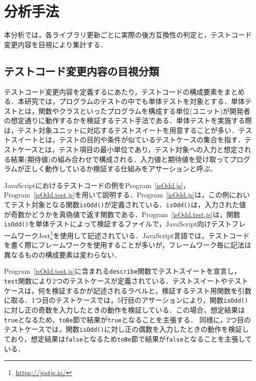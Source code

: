 \documentclass[11pt,dvipdfmx]{jreport}
\begin{document}


\section{分析手法}
本分析では，各ライブラリ更新ごとに実際の後方互換性の判定と，テストコード変更内容を目視により集計する．

\subsection{テストコード変更内容の目視分類}
テストコード変更内容を定義するにあたり，テストコードの構成要素をまとめる．本研究では，プログラムのテストの中でも単体テストを対象とする．単体テストとは，関数やクラスといったプログラムを構成する単位(ユニット)が開発者の想定通りに動作するかを検証するテスト手法である．単体テストを実施する際は，テスト対象ユニットに対応するテストスイートを用意することが多い．テストスイートとは，テストの目的や条件が似ているテストケースの集合を指す．テストケースとは，テスト項目の最小単位であり，テスト対象への入力と想定される結果(期待値)の組み合わせで構成される．入力値と期待値を受け取ってプログラムが正しく動作しているか検証する仕組みをアサーションと呼ぶ．

JavaScriptにおけるテストコードの例をProgram~\ref{isOdd.js}，Program~\ref{isOdd.test.js}を用いて説明する．Program~\ref{isOdd.js}は，この例においてテスト対象となる関数{\verb|isOdd()|}が定義されている．{\verb|isOdd()|}は，入力された値が奇数かどうかを真偽値で返す関数である．Program~\ref{isOdd.test.js}は，関数{\verb|isOdd()|}を単体テストによって検証するファイルで，JavaScript向けテストフレームワークJest\footnote{\url{https://jestjs.io/}}を使用して記述されている．JavaScript言語では，テストコードを書く際にフレームワークを使用することが多いが，フレームワーク毎に記法は異なるものの構成要素は変わらない．

Program~\ref{isOdd.test.js}に含まれる{\verb|describe|}関数でテストスイートを宣言し，{\verb|test|}関数により2つのテストケースが定義されている．テストスイートやテストケースは，何を検証するかが記述されるラベルと，検証するテスト用関数を引数に取る．1つ目のテストケースでは，5行目のアサーションにより，関数{\verb|isOdd()|}に対し正の奇数を入力したときの動作を検証している．この場合，想定結果は{\verb|true|}となるため，{\verb|toBe|}節で結果が{\verb|true|}となることを主張する．
同様に，2つ目のテストケースでは，関数{\verb|isOdd()|}に対し正の偶数を入力したときの動作を検証しており，想定結果は{\verb|false|}となるため{\verb|toBe|}節で結果が{\verb|false|}となることを主張している．
\end{document}
